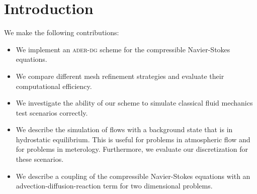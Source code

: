 \chapter{Introduction}
We make the following contributions:

\begin{itemize}
\item We implement an \textsc{ader-dg} scheme for the compressible Navier-Stokes equations.
\item We compare different mesh refinement strategies and evaluate their computational efficiency.
\item We investigate the ability of our scheme to simulate classical fluid mechanics test scenarios correctly.
\item We describe the simulation of flows with a background state that is in hydrostatic equilibrium.
  This is useful for problems in atmospheric flow and for problems in meterology.
  Furthermore, we evaluate our discretization for these scenarios.
\item We describe a coupling of the compressible Navier-Stokes equations with an advection-diffusion-reaction term for two dimensional problems.
\end{itemize}

